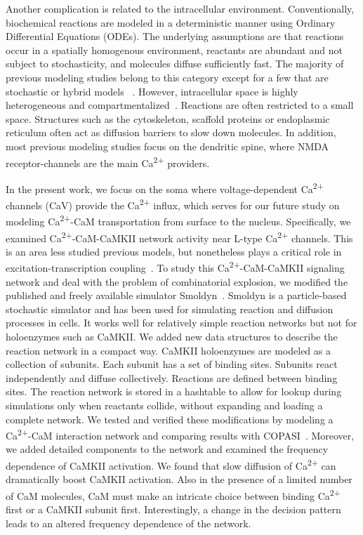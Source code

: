 \documentclass[10pt,letterpaper]{article}
\begin{document}
Another complication is related to the intracellular environment. Conventionally, biochemical reactions are modeled in a deterministic manner using Ordinary Differential Equations (ODEs). The underlying assumptions are that reactions occur in a spatially homogenous environment, reactants are abundant and not subject to stochasticity, and molecules diffuse sufficiently fast. The majority of previous modeling studies belong to this category except for a few that are stochastic or hybrid models ~\cite{Bhalla:2004cu, Zeng:2010bq, Holmes:2000uk}. However, intracellular space is highly heterogeneous and compartmentalized~\cite{LubyPhelps:2000uj,Dix:2008gy}. Reactions are often restricted to a small space. Structures such as the cytoskeleton, scaffold proteins or endoplasmic reticulum often act as diffusion barriers to slow down molecules. In addition, most previous modeling studies focus on the dendritic spine, where NMDA receptor-channels are the main Ca\textsuperscript{2+} providers. 

In the present work, we focus on the soma where voltage-dependent Ca\textsuperscript{2+} channels (CaV) provide the Ca\textsuperscript{2+} influx, which serves for our future study on modeling Ca\textsuperscript{2+}-CaM transportation from surface to the nucleus. Specifically, we examined Ca\textsuperscript{2+}-CaM-CaMKII network activity near L-type Ca\textsuperscript{2+} channels. This is an area less studied previous models, but nonetheless plays a critical role in excitation-transcription coupling~\cite{Ma:2015bg,Li:2016cq}. To study this Ca\textsuperscript{2+}-CaM-CaMKII signaling network and deal with the problem of combinatorial explosion, we modified the published and freely available simulator Smoldyn~\cite{Andrews:2004fs}. Smoldyn is a particle-based stochastic simulator and has been used for simulating reaction and diffusion processes in cells. It works well for relatively simple reaction networks but not for holoenzymes such as CaMKII. We added new data structures to describe the reaction network in a compact way. CaMKII holoenzymes are modeled as a collection of subunits. Each subunit has a set of binding sites. Subunits react independently and diffuse collectively. Reactions are defined between binding sites. The reaction network is stored in a hashtable to allow for lookup during simulations only when reactants collide, without expanding and loading a complete network. We tested and verified these modifications by modeling a Ca\textsuperscript{2+}-CaM interaction network and comparing results with COPASI~\cite{Hoops:2006gy}. Moreover, we added detailed components to the network and examined the frequency dependence of CaMKII activation. We found that slow diffusion of Ca\textsuperscript{2+} can dramatically boost CaMKII activation. Also in the presence of a limited number of CaM molecules, CaM must make an intricate choice between binding Ca\textsuperscript{2+} first or a CaMKII subunit first. Interestingly, a change in the decision pattern leads to an altered frequency dependence of the network. 
\end{document}
